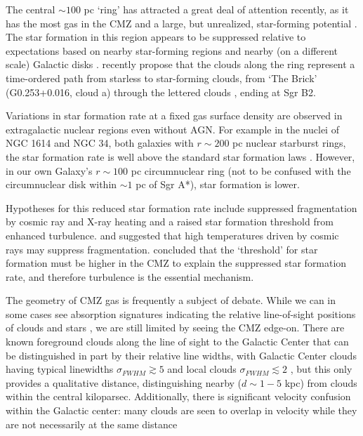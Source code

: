 The central $\sim100$ pc `ring' \citep{Sofue1995a,Molinari2011a} has attracted
a great deal of attention recently, as it has the most gas in the CMZ and a
large, but unrealized, star-forming potential
\citep{Longmore2013a,Longmore2012b,Longmore2012a,Kruijssen2013a,Yusef-Zadeh2009a,Immer2012a}.
The star formation in this region appears to be suppressed relative to
expectations based on nearby star-forming regions and nearby (on a different
scale) Galactic disks
\citep{Kennicutt1998a,Kennicutt2012a,Leroy2013a,Heiderman2010a}.
\citet{Longmore2013a} recently propose that the clouds along the ring represent
a time-ordered path from starless to star-forming clouds, from `The Brick'
(G0.253+0.016, cloud a) through the lettered clouds \citep[cloud
b,c,d,e,f][]{Lis199a}, ending at Sgr B2.

Variations in star formation rate at a fixed gas surface density are observed
in extragalactic nuclear regions even without AGN.  For example in the nuclei of NGC
1614 and NGC 34, both galaxies with $r\sim200$ pc nuclear starburst rings, the
star formation
rate is well above the standard star formation laws \citep{Xu2014b}.  However,
in our own Galaxy's $r\sim100$ pc circumnuclear ring (not to be confused with the
circumnuclear disk within $\sim1$ pc of Sgr A*), star formation is lower.

Hypotheses for this reduced star formation rate include suppressed
fragmentation by cosmic ray and X-ray heating and a raised star formation
threshold from enhanced turbulence.  \citet{Papadopoulos2010a} and
\citet{Papadopoulos2011a} suggested that high temperatures driven by cosmic
rays may suppress fragmentation.  \citet{Kruijssen2014c} concluded that the
`threshold' for star formation must be higher in the CMZ to explain the
suppressed star formation rate, and therefore turbulence is the essential
mechanism.  

The geometry of CMZ gas is frequently a subject of debate.  While we can in
some cases see absorption signatures indicating the relative line-of-sight
positions of clouds and stars \citep{Longmore2012b,Yusef-Zadeh2012a}, we are
still limited by seeing the CMZ edge-on.  There are known foreground clouds
along the line of sight to the Galactic Center that can be distinguished in
part by their relative line widths, with Galactic Center clouds having typical
linewidths $\sigma_{FWHM}\gtrsim5$ \kms and local clouds $\sigma_{FWHM}
\lesssim 2$ \kms, but this only provides a qualitative distance, distinguishing
nearby ($d\sim1-5$ kpc) from clouds within the central kiloparsec.  Additionally,
there is significant velocity confusion within the Galactic center: many clouds
are seen to overlap in velocity while they are not necessarily at the same distance
\citep{Jones2012a,Oka2012a}

